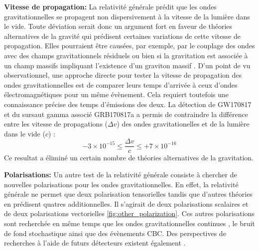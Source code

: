 \vspace{0.2cm}
\textbf{Vitesse de propagation:} La relativité générale prédit que les ondes gravitationnelles se propagent non dispersivement à la vitesse de la lumière dans le vide.
Toute déviation serait donc un argument fort en faveur de théories alternatives de la gravité qui prédisent certaines variations de cette vitesse de propagation.
Elles pourraient être causées, par exemple, par le couplage des ondes avec des champs gravitationnels résiduels ou bien si la gravitation est associée à un champ massifs impliquant l'existence d'un graviton massif \cite{Will_1998,Will_2014,testingGR}.
D'un point de vu observationnel, une approche directe pour tester la vitesse de propagation des ondes gravitationnelles est de comparer leurs temps d'arrivée à ceux d'ondes électromagnétiques pour un même évènement.
Cela requiert toutefois une connaissance précise des temps d'émissions des deux.
La détection de GW170817 et du sursaut gamma associé GRB170817a a permis de contraindre la différence entre les vitesse de propagations ($\Delta v$) des ondes gravitationelles et de la lumière dans le vide ($c$) \cite{gw170817_multi_2}: $$-3 \times 10^{-15} \leq \frac{\Delta v}{c} \leq +7 \times 10^{-16}$$
Ce resultat a éliminé un certain nombre de théories alternatives de la gravitation.

\vspace{0.2cm}
\textbf{Polarisations:} Un autre test de la relativité générale consiste à chercher de nouvelles polarisations pour les ondes gravitationnelles.
En effet, la relativité générale ne permet que deux polarisation tensorielles tandis que d'autres théories en prédisent quatres additionnelles.
Il s'agirait de deux polarisations scalaires et de deux polarisations vectorielles \ref{fig:other_polarization}.
Ces autres polarisations sont recherchée en même temps que les ondes gravitationnelles continues \cite{other_polarization_cw}, le bruit de fond stochastique \cite{polarization} ainsi que des évènements CBC.
Des perspectives de recherches à l'aide de futurs détecteurs existent également \cite{testingGR,other_polarization_cbc}.

